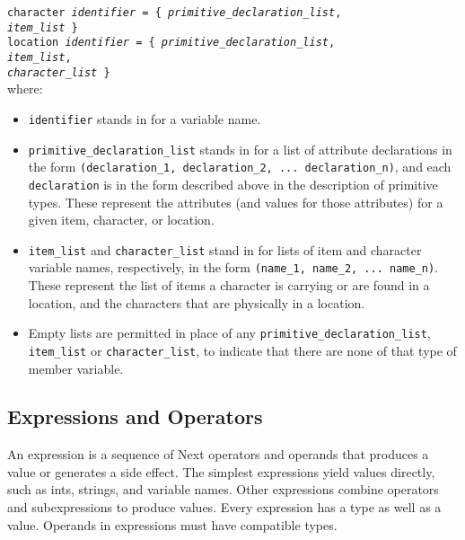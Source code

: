 \documentclass[12pt]{article}
\begin{document}
\texttt{character \textit{identifier} = \{ \textit{primitive\_declaration\_list}, \\
\indent \indent \indent \indent \indent \indent \indent \indent \indent \indent  \textit{item\_list} \} } \\

\texttt{location \textit{identifier} = \{ \textit{primitive\_declaration\_list}, \\
\indent \indent \indent \indent \indent \indent \indent \indent \indent \indent  \textit{item\_list}, \\
\indent \indent \indent \indent \indent \indent \indent \indent \indent \indent  \textit{character\_list} \}} \\

\noindent where:
\begin{itemize}
\item \texttt{identifier} stands in for a variable name.
\item \texttt{primitive\_declaration\_list} stands in for a list of attribute declarations in the form \texttt{(declaration\_1, declaration\_2, ... declaration\_n)}, and each \texttt{declaration} is in the form described above in the description of primitive types.  These represent the attributes (and values for those attributes) for a given item, character, or location.
\item \texttt{item\_list} and \texttt{character\_list} stand in for lists of item and character variable names, respectively, in the form \texttt{(name\_1, name\_2, ... name\_n)}.  These represent the list of items a character is carrying or are found in a location, and the characters that are physically in a location.
\item Empty lists are permitted in place of any \texttt{primitive\_declaration\_list}, \texttt{item\_list} or \texttt{character\_list}, to indicate that there are none of that type of member variable.
\end{itemize}

\subsection{Expressions and Operators}
An expression is a sequence of Next operators and operands that produces a value or generates a side effect.  The simplest expressions yield values directly, such as ints, strings, and variable names.  Other expressions combine operators and subexpressions to produce values.  Every expression has a type as well as a value.  Operands in expressions must have compatible types.
\end{document}
